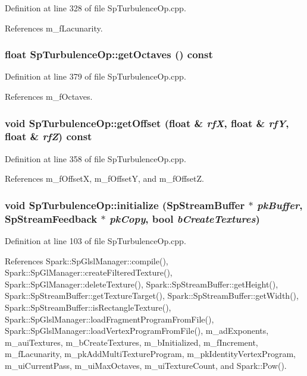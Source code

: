Definition at line 328 of file Sp\-Turbulence\-Op.cpp.

References m\_\-f\-Lacunarity.
\subsubsection{\setlength{\rightskip}{0pt plus 5cm}float Sp\-Turbulence\-Op::get\-Octaves () const}\label{classSpark_1_1SpTurbulenceOp_a6}


Definition at line 379 of file Sp\-Turbulence\-Op.cpp.

References m\_\-f\-Octaves.
\subsubsection{\setlength{\rightskip}{0pt plus 5cm}void Sp\-Turbulence\-Op::get\-Offset (float \& {\em rf\-X}, float \& {\em rf\-Y}, float \& {\em rf\-Z}) const\hspace{0.3cm}{\tt  [virtual]}}\label{classSpark_1_1SpTurbulenceOp_a12}


Definition at line 358 of file Sp\-Turbulence\-Op.cpp.

References m\_\-f\-Offset\-X, m\_\-f\-Offset\-Y, and m\_\-f\-Offset\-Z.
\subsubsection{\setlength{\rightskip}{0pt plus 5cm}void Sp\-Turbulence\-Op::initialize ({\bf Sp\-Stream\-Buffer} $\ast$ {\em pk\-Buffer}, {\bf Sp\-Stream\-Feedback} $\ast$ {\em pk\-Copy}, bool {\em b\-Create\-Textures})}\label{classSpark_1_1SpTurbulenceOp_a2}


Definition at line 103 of file Sp\-Turbulence\-Op.cpp.

References Spark::Sp\-Glsl\-Manager::compile(), Spark::Sp\-Gl\-Manager::create\-Filtered\-Texture(), Spark::Sp\-Gl\-Manager::delete\-Texture(), Spark::Sp\-Stream\-Buffer::get\-Height(), Spark::Sp\-Stream\-Buffer::get\-Texture\-Target(), Spark::Sp\-Stream\-Buffer::get\-Width(), Spark::Sp\-Stream\-Buffer::is\-Rectangle\-Texture(), Spark::Sp\-Glsl\-Manager::load\-Fragment\-Program\-From\-File(), Spark::Sp\-Glsl\-Manager::load\-Vertex\-Program\-From\-File(), m\_\-ad\-Exponents, m\_\-aui\-Textures, m\_\-b\-Create\-Textures, m\_\-b\-Initialized, m\_\-f\-Increment, m\_\-f\-Lacunarity, m\_\-pk\-Add\-Multi\-Texture\-Program, m\_\-pk\-Identity\-Vertex\-Program, m\_\-ui\-Current\-Pass, m\_\-ui\-Max\-Octaves, m\_\-ui\-Texture\-Count, and Spark::Pow().

